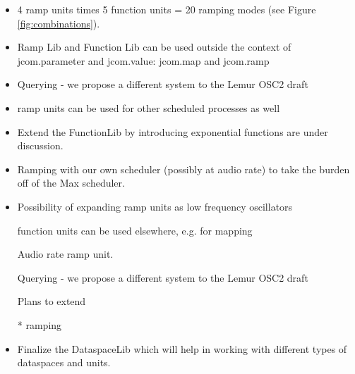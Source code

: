 \documentclass{article}
\begin{document}
\begin{itemize}
    \item 4 ramp units times 5 function units = 20 ramping modes (see Figure \ref{fig:combinations}).
	\vspace{-8pt}
	\item Ramp Lib and Function Lib can be used outside the context of jcom.parameter and jcom.value: jcom.map and jcom.ramp
	\vspace{-8pt}
	\item Querying - we propose a different system to the Lemur OSC2 draft
	\vspace{-8pt}

	\item ramp units can be used for other scheduled processes as well
	\vspace{-8pt}
	\item Extend the FunctionLib by introducing exponential functions are under discussion. 

	\vspace{-8pt}

	\item Ramping with our own scheduler (possibly at audio rate) to take the burden off of the Max scheduler.

	\vspace{-8pt}

	\item Possibility of expanding ramp units as low frequency oscillators

function units can be used elsewhere, e.g. for mapping

Audio rate ramp unit.

Querying - we propose a different system to the Lemur OSC2 draft



Plans to extend %


* ramping 	\vspace{-8pt}
	\item Finalize the DataspaceLib which will help in working with different types of dataspaces and units. 
	\vspace{-8pt}
\end{itemize}



\end{document}
